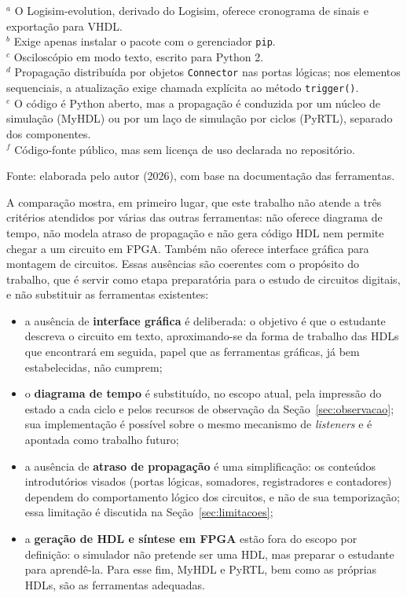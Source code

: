 \begin{table}[H]
{$^{a}$ O Logisim-evolution, derivado do Logisim, oferece cronograma de sinais e exportação para VHDL. \\
$^{b}$ Exige apenas instalar o pacote com o gerenciador \texttt{pip}. \\
$^{c}$ Osciloscópio em modo texto, escrito para Python 2. \\
$^{d}$ Propagação distribuída por objetos \texttt{Connector} nas portas lógicas; nos elementos sequenciais, a atualização exige chamada explícita ao método \texttt{trigger()}. \\
$^{e}$ O código é Python aberto, mas a propagação é conduzida por um núcleo de simulação (MyHDL) ou por um laço de simulação por ciclos (PyRTL), separado dos componentes. \\
$^{f}$ Código-fonte público, mas sem licença de uso declarada no repositório.\par}
\begin{center}
\footnotesize Fonte: elaborada pelo autor (2026), com base na documentação das ferramentas.
\end{center}
\end{table}

A comparação mostra, em primeiro lugar, que este trabalho não atende a três critérios atendidos por várias das outras ferramentas: não oferece diagrama de tempo, não modela atraso de propagação e não gera código HDL nem permite chegar a um circuito em FPGA. Também não oferece interface gráfica para montagem de circuitos. Essas ausências são coerentes com o propósito do trabalho, que é servir como etapa preparatória para o estudo de circuitos digitais, e não substituir as ferramentas existentes:

\begin{itemize}
    \item a ausência de \textbf{interface gráfica} é deliberada: o objetivo é que o estudante descreva o circuito em texto, aproximando-se da forma de trabalho das HDLs que encontrará em seguida, papel que as ferramentas gráficas, já bem estabelecidas, não cumprem;
    \item o \textbf{diagrama de tempo} é substituído, no escopo atual, pela impressão do estado a cada ciclo e pelos recursos de observação da Seção~\ref{sec:observacao}; sua implementação é possível sobre o mesmo mecanismo de \textit{listeners} e é apontada como trabalho futuro;
    \item a ausência de \textbf{atraso de propagação} é uma simplificação: os conteúdos introdutórios visados (portas lógicas, somadores, registradores e contadores) dependem do comportamento lógico dos circuitos, e não de sua temporização; essa limitação é discutida na Seção~\ref{sec:limitacoes};
    \item a \textbf{geração de HDL e síntese em FPGA} estão fora do escopo por definição: o simulador não pretende ser uma HDL, mas preparar o estudante para aprendê-la. Para esse fim, MyHDL e PyRTL, bem como as próprias HDLs, são as ferramentas adequadas.
\end{itemize}


